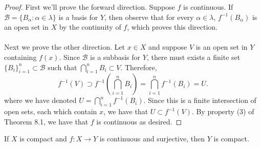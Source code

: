 \documentclass[letter,12pt,twoside]{hmcpset}
\begin{document}
\begin{proof}
    First we'll prove the forward direction. Suppose $f$ is
    continuous. If $\mathscr{B} = \{B_\alpha : \alpha \in \lambda\}$
    is a basis for $Y$, then observe that for every $\alpha \in
    \lambda$, $f^{-1}(B_\alpha)$ is an open set in $X$ by the
    continuity of $f$, which proves this direction. 
    \\
    \\
    Next we prove the other direction. Let $x \in X$ and suppose
    $V$ is an open set in $Y$ containing $f(x)$. Since $\mathscr{B}$ 
    is a subbasis for $Y$, there must exists a
    finite set $\{B_i\}_{i = 1}^n \subset \mathscr{B}$ such that
    $\bigcap\limits_{i = 1}^nB_i \subset V$. Therefore, 
    \[
      f^{-1}(V) \supset f^{-1}(\bigcap\limits_{i = 1}^nB_i) = \bigcap\limits_{i = 1}^n f^{-1}(B_i) = U.
    \]  
    where we have denoted $U = \bigcap\limits_{i = 1}^n f^{-1}(B_i)$. 
    Since this is a finite intersection of open sets, each which
    contain $x$, we have that $U \subset f^{-1}(V)$. By property (3)
    of Theorem 8.1, we have that $f$ is continuous as desired.
\end{proof}

\begin{problem}[Theorem 8.15]
    If $X$ is compact and $f: X \rightarrow Y$ is continuous and 
    surjective, then $Y$ is compact.
\end{problem}
\end{document}

